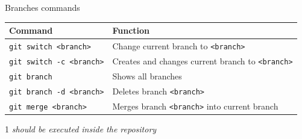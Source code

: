 \documentclass[10pt, graphics, aspectratio=169, table]{beamer}
\begin{document}
    \begin{frame}{Branches commands}
        \begin{table}
            \centering
            \begin{threeparttable}
                \begin{tabular}{ll}
                    \toprule
                    Command & Function \\
                    \midrule
                    \texttt{git switch <branch>} & Change current branch to \texttt{<branch>}\tnote{1} \\
                    \texttt{git switch -c <branch>} & Creates and changes current branch to \texttt{<branch>}\tnote{1} \\
                    \texttt{git branch} & Shows all branches\tnote{1} \\
                    \texttt{git branch -d <branch>} & Deletes branch \texttt{<branch>}\tnote{1} \\
                    \texttt{git merge <branch>} & Merges branch \texttt{<branch>} into current branch\tnote{1} \\
                    \bottomrule
                \end{tabular}
                \begin{tablenotes}
                    \item [1]\emph{should be executed inside the repository}
                \end{tablenotes}
            \end{threeparttable}
        \end{table}
    \end{frame}
\end{document}
